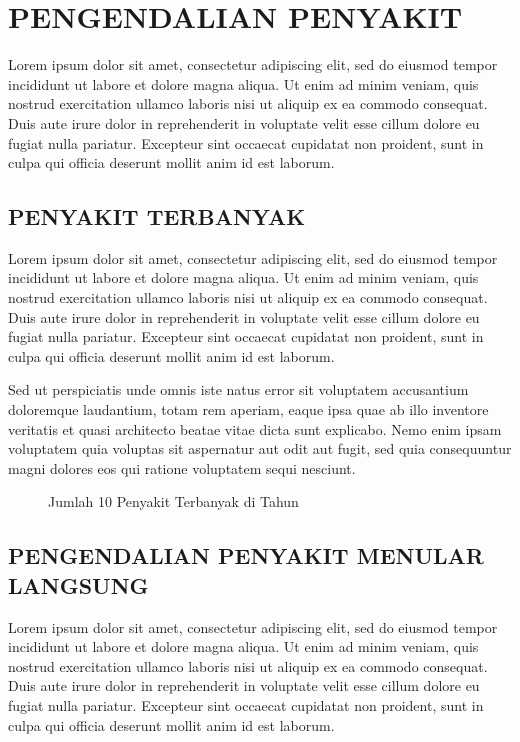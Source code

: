 \chapter{PENGENDALIAN PENYAKIT}
Lorem ipsum dolor sit amet, consectetur adipiscing elit, sed do eiusmod tempor incididunt ut labore et dolore magna aliqua. Ut enim ad minim veniam, quis nostrud exercitation ullamco laboris nisi ut aliquip ex ea commodo consequat. Duis aute irure dolor in reprehenderit in voluptate velit esse cillum dolore eu fugiat nulla pariatur. Excepteur sint occaecat cupidatat non proident, sunt in culpa qui officia deserunt mollit anim id est laborum.

\section{PENYAKIT TERBANYAK}
Lorem ipsum dolor sit amet, consectetur adipiscing elit, sed do eiusmod tempor incididunt ut labore et dolore magna aliqua. Ut enim ad minim veniam, quis nostrud exercitation ullamco laboris nisi ut aliquip ex ea commodo consequat. Duis aute irure dolor in reprehenderit in voluptate velit esse cillum dolore eu fugiat nulla pariatur. Excepteur sint occaecat cupidatat non proident, sunt in culpa qui officia deserunt mollit anim id est laborum.

Sed ut perspiciatis unde omnis iste natus error sit voluptatem accusantium doloremque laudantium, totam rem aperiam, eaque ipsa quae ab illo inventore veritatis et quasi architecto beatae vitae dicta sunt explicabo. Nemo enim ipsam voluptatem quia voluptas sit aspernatur aut odit aut fugit, sed quia consequuntur magni dolores eos qui ratione voluptatem sequi nesciunt.

\begin{figure}[H]
	\centering
	\caption{Jumlah 10 Penyakit Terbanyak di \namaKabupaten Tahun \tP}
	\label{fig:10-penyakit-terbanyak}
\end{figure}

\section[PENGENDALIAN PM]{PENGENDALIAN PENYAKIT MENULAR LANGSUNG}
Lorem ipsum dolor sit amet, consectetur adipiscing elit, sed do eiusmod tempor incididunt ut labore et dolore magna aliqua. Ut enim ad minim veniam, quis nostrud exercitation ullamco laboris nisi ut aliquip ex ea commodo consequat. Duis aute irure dolor in reprehenderit in voluptate velit esse cillum dolore eu fugiat nulla pariatur. Excepteur sint occaecat cupidatat non proident, sunt in culpa qui officia deserunt mollit anim id est laborum.

